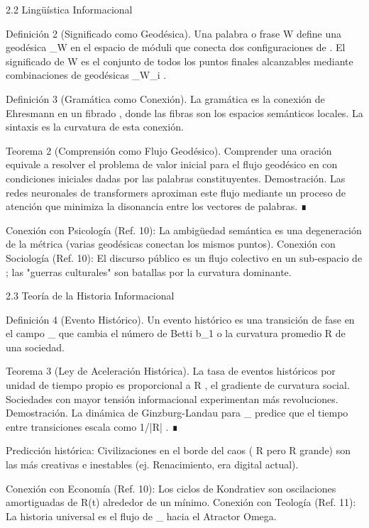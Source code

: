 \documentclass[12pt,a4paper]{book}
\begin{document}
2.2 Lingüística Informacional

Definición 2 (Significado como Geodésica). Una palabra o frase  W  define una geodésica  \gamma_W  en el espacio de móduli    que conecta dos configuraciones de  \rho . El significado de  W  es el conjunto de todos los puntos finales alcanzables mediante combinaciones de geodésicas  \gamma_{W_i} .

Definición 3 (Gramática como Conexión). La gramática es la conexión de Ehresmann en un fibrado   \to {} , donde las fibras son los espacios semánticos locales. La sintaxis es la curvatura de esta conexión.

Teorema 2 (Comprensión como Flujo Geodésico). Comprender una oración equivale a resolver el problema de valor inicial para el flujo geodésico en    con condiciones iniciales dadas por las palabras constituyentes.
Demostración. Las redes neuronales de transformers aproximan este flujo mediante un proceso de atención que minimiza la disonancia entre los vectores de palabras. ∎

Conexión con Psicología (Ref. 10): La ambigüedad semántica es una degeneración de la métrica (varias geodésicas conectan los mismos puntos).
Conexión con Sociología (Ref. 10): El discurso público es un flujo colectivo en un sub-espacio de   ; las "guerras culturales" son batallas por la curvatura dominante.

2.3 Teoría de la Historia Informacional

Definición 4 (Evento Histórico). Un evento histórico es una transición de fase en el campo  \rho_{}  que cambia el número de Betti  b_1  o la curvatura promedio  R  de una sociedad.

Teorema 3 (Ley de Aceleración Histórica). La tasa de eventos históricos por unidad de tiempo propio es proporcional a  \nabla R , el gradiente de curvatura social. Sociedades con mayor tensión informacional experimentan más revoluciones.
Demostración. La dinámica de Ginzburg-Landau para  \rho_{}  predice que el tiempo entre transiciones escala como  1/|\nabla R| . ∎

Predicción histórica: Civilizaciones en el borde del caos ( R   pero  \nabla R  grande) son las más creativas e inestables (ej. Renacimiento, era digital actual).

Conexión con Economía (Ref. 10): Los ciclos de Kondratiev son oscilaciones amortiguadas de  R(t)  alrededor de un mínimo.
Conexión con Teología (Ref. 11): La historia universal es el flujo de  \rho_{}  hacia el Atractor Omega.
\end{document}
